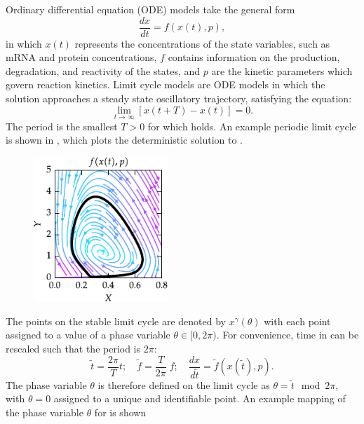 Ordinary differential equation (ODE) models take the general form
\begin{equation}
  \frac{dx}{dt} = f(x(t), p),
  \label{eq:odefn}
\end{equation}
in which $x(t)$ represents the concentrations of the state variables, such as mRNA and protein concentrations, $f$ contains information on the production, degradation, and reactivity of the states, and $p$ are the kinetic parameters which govern reaction kinetics.
Limit cycle models are ODE models in which the solution approaches a steady state oscillatory trajectory, satisfying the equation:
\begin{equation}
  \lim_{t \to \infty} \left[ x(t + T) - x(t) \right] = 0.
  \label{eq:limit5}
\end{equation}
The period is the smallest $T > 0$ for which  holds. 
An example periodic limit cycle is shown in , which plots the deterministic solution to .

\begin{figure}[tbp]
  \centering
  \includegraphics[width=0.45\textwidth]{chap1/figures/state_space.pdf}
  \label{fig:statespace}
\end{figure}


The points on the stable limit cycle are denoted by $x^\gamma(\theta)$ with each point assigned to a value of a phase variable $\theta \in [0, 2\pi)$.
For convenience, time in  can be rescaled such that the period is $2\pi$:
\begin{equation}
  \tilde{t} = \frac{2\pi}{T}t; \quad \tilde{f} = \frac{T}{2\pi}\;f; \quad \frac{dx}{d\tilde{t}} = \tilde{f}(x(\tilde{t}), p).
  \label{eq:that}
\end{equation}
The phase variable $\theta$ is therefore defined on the limit cycle as $\theta = \tilde{t}\mod 2\pi$, with $\theta = 0$ assigned to a unique and identifiable point. An example mapping of the phase variable $\theta$ for  is shown 

